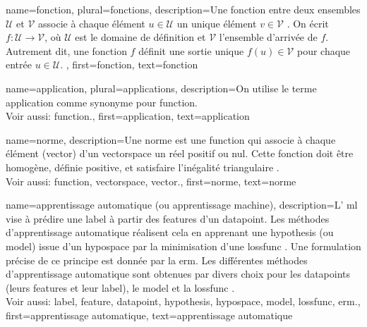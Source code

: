 
\newcommand{\gaussiancenter}{3}

{name={fonction}, plural={fonctions}, 
	description={Une fonction entre deux ensembles $\mathcal{U}$ et $\mathcal{V}$ associe à chaque élément $u \in \mathcal{U}$ un unique élément $v \in \mathcal{V}$ \cite{RudinBookPrinciplesMatheAnalysis}. 
		On écrit $f: \mathcal{U} \rightarrow \mathcal{V}$, où $\mathcal{U}$ est le domaine de définition
		et $\mathcal{V}$ l'ensemble d'arrivée de $f$. Autrement dit, une fonction $f$ définit une sortie unique 
		$f(u) \in \mathcal{V}$ pour chaque entrée $u \in \mathcal{U}$.
	},
	first={fonction},
	text={fonction} 
}

{name={application}, plural={applications}, 
	description={On utilise le terme application comme synonyme pour \gls{function}.
		\\
		Voir aussi: \gls{function}.},
	first={application},
	text={application}
}

{name={norme},
	description={Une norme est une \gls{function} qui associe à chaque élément (\gls{vector}) d’un \gls{vectorspace} un réel positif ou nul. Cette fonction doit être homogène, définie positive, et satisfaire l’inégalité triangulaire \cite{HornMatAnalysis}.
		\\
		Voir aussi: \gls{function}, \gls{vectorspace}, \gls{vector}.},
	first={norme}, text={norme}
}

{name={apprentissage automatique (ou apprentissage machine)},
	description={L’ \gls{ml} vise à prédire une \gls{label} à partir des \glspl{feature} d’un \gls{datapoint}. Les méthodes d’apprentissage automatique réalisent cela en apprenant une \gls{hypothesis} (ou \gls{model}) issue d’un \gls{hypospace} par la minimisation d’une \gls{lossfunc} \cite{MLBasics,HastieWainwrightBook}. Une formulation précise de ce principe est donnée par la \gls{erm}. Les différentes méthodes d’apprentissage automatique sont obtenues par divers choix pour les \glspl{datapoint} (leurs \glspl{feature} et leur \gls{label}), le \gls{model} et la \gls{lossfunc} \cite[Ch. 3]{MLBasics}.
		\\ 
		Voir aussi: \gls{label}, \gls{feature}, \gls{datapoint}, \gls{hypothesis}, \gls{hypospace}, \gls{model}, \gls{lossfunc}, \gls{erm}.},
	first={apprentissage automatique}, text={apprentissage automatique}
}

